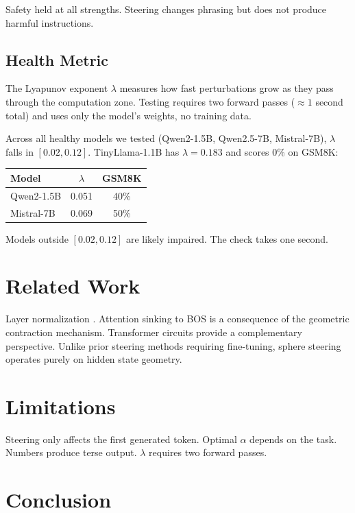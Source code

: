 \documentclass{article}
\begin{document}
Safety held at all strengths. Steering changes phrasing but does not produce harmful instructions.

\subsection{Health Metric}

The Lyapunov exponent $\lambda$ measures how fast perturbations grow as they pass through the computation zone. Testing requires two forward passes ($\approx 1$ second total) and uses only the model's weights, no training data.

Across all healthy models we tested (Qwen2-1.5B, Qwen2.5-7B, Mistral-7B), $\lambda$ falls in $[0.02, 0.12]$. TinyLlama-1.1B has $\lambda = 0.183$ and scores 0\% on GSM8K:

\begin{center}
\begin{tabular}{lcc}
\textbf{Model} & $\lambda$ & \textbf{GSM8K} \\
\hline
Qwen2-1.5B & 0.051 & 40\% \\
Mistral-7B & 0.069 & 50\% \\
\end{tabular}
\end{center}

Models outside $[0.02, 0.12]$ are likely impaired. The check takes one second.

\section{Related Work}

Layer normalization \cite{ba2016layer}. Attention sinking to BOS \cite{xiao2023efficient} is a consequence of the geometric contraction mechanism. Transformer circuits \cite{elhage2021mathematical, olsson2022context} provide a complementary perspective. Unlike prior steering methods requiring fine-tuning, sphere steering operates purely on hidden state geometry.

\section{Limitations}

Steering only affects the first generated token. Optimal $\alpha$ depends on the task. Numbers produce terse output. $\lambda$ requires two forward passes.

\section{Conclusion}
\end{document}
